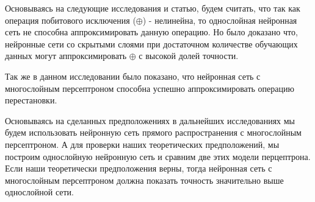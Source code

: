 Основываясь на следующие исследования\cite{bnb}\cite{towards} и статью\cite{implement}, будем считать, что так как операция побитового исключения ($\oplus$) - нелинейна, то однослойная нейронная сеть не способна аппроксимировать данную операцию. Но было доказано что, нейронные сети со скрытыми слоями при достаточном количестве обучающих данных могут аппроксимировать $\oplus$ с высокой долей точности.
\bigskip

Так же в данном исследовании\cite{permutation} было показано, что нейронная сеть с многослойным персептроном способна успешно аппроксимировать операцию перестановки.
\bigskip

Основываясь на сделанных предположениях в дальнейших исследованиях мы будем использовать нейронную сеть прямого распространения с
многослойным персептроном. А для проверки наших теоретических предположений, мы построим однослойную нейронную сеть и сравним две этих модели перцептрона. Если наши теоретически предположения верны, тогда нейронная сеть с многослойным персептроном должна показать точность значительно выше однослойной сети.


